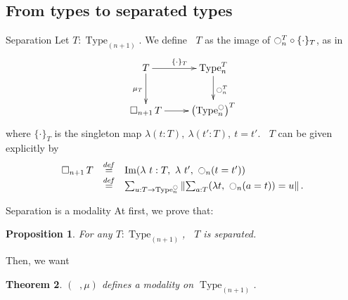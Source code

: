 \documentclass{beamer}
\newtheorem{thm}{Theorem}
\newtheorem{prop}[thm]{Proposition}
\newcommand \defeq {\overset{de\hspace{-0.2ex}f}{=}}
\DeclareMathOperator{\Type}{Type}
\DeclareMathOperator{\im}{Im}
\newcommand{\modal}{\ensuremath{\ocircle}}
\newcommand \separated {\mathop{\square_{n+1}} }
\newcommand{\nType}[1]{\Type_{#1}}
\begin{document}
\subsection[Separation]{From types to separated types}
\label{sec:from-types-separated}

\begin{frame}{}{Separation}
  \note{ }
  Let $T : \nType {(n+1)}$. We define $\separated T$ as the image of
  $\modal_n^T \circ \{\cdot\}_T$, as in
  $$\xymatrix{
    T \ar[r]^{\{\cdot\}_T} \ar[d]_{\mu_T} & \nType n^T \ar[d]^{\modal_n^T} \\
    \separated T \ar[r]& \left( \nType n^\modal \right)^T
  }$$
  where $\{\cdot\}_T$ is the singleton map $\lambda (t:T),~\lambda
  (t':T),~t=t'$.
  \pause
  $\separated T$ can be given explicitly by
  $$
  \begin{array}{rcl}
    \separated T &\defeq & \im (\lambda~t:T,~\lambda~ t',~ \modal_n (t = t')) \\
                 & \defeq & \sum_{u:T \to \nType n^\modal} \left\| \sum_{a:T} 
                            (\lambda t,~\modal_n (a=t)) = u\right\|.
  \end{array}
  $$
\end{frame}

\begin{frame}{}{Separation is a modality}
  \note{ }
  At first, we prove that:
  \begin{prop}
    For any $T:\nType {(n+1)}$, $\separated T$ is separated.  
  \end{prop}
  \pause
  \vspace{1em}
  
  Then, we want
  \begin{thm}
    $(\separated,\mu)$ defines a modality on $\nType {(n+1)}$.
  \end{thm}
\end{frame}
\end{document}
